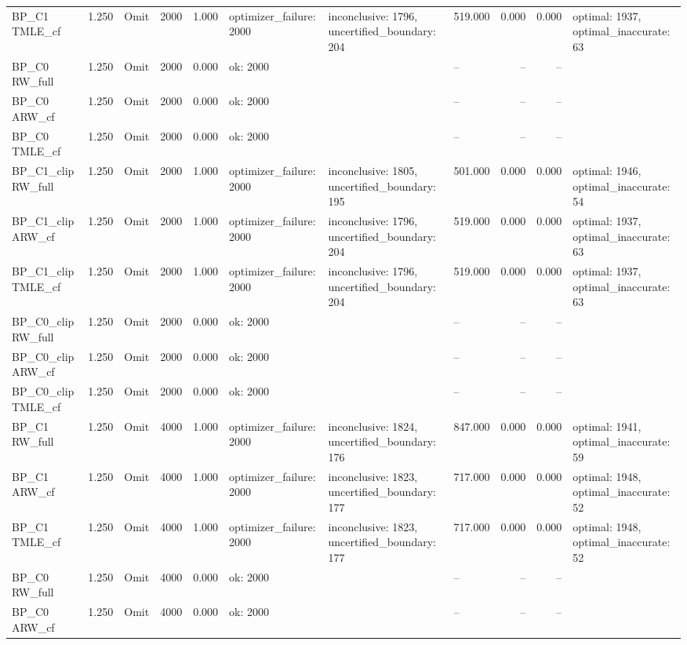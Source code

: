 \begin{tabular}{llllrlllrrl}
BP\_C1 TMLE\_cf & 1.250 & Omit & 2000 & 1.000 & optimizer\_failure: 2000 & inconclusive: 1796, uncertified\_boundary: 204 & 519.000 & 0.000 & 0.000 & optimal: 1937, optimal\_inaccurate: 63 \\
BP\_C0 RW\_full & 1.250 & Omit & 2000 & 0.000 & ok: 2000 &  & -- & -- & -- &  \\
BP\_C0 ARW\_cf & 1.250 & Omit & 2000 & 0.000 & ok: 2000 &  & -- & -- & -- &  \\
BP\_C0 TMLE\_cf & 1.250 & Omit & 2000 & 0.000 & ok: 2000 &  & -- & -- & -- &  \\
BP\_C1\_clip RW\_full & 1.250 & Omit & 2000 & 1.000 & optimizer\_failure: 2000 & inconclusive: 1805, uncertified\_boundary: 195 & 501.000 & 0.000 & 0.000 & optimal: 1946, optimal\_inaccurate: 54 \\
BP\_C1\_clip ARW\_cf & 1.250 & Omit & 2000 & 1.000 & optimizer\_failure: 2000 & inconclusive: 1796, uncertified\_boundary: 204 & 519.000 & 0.000 & 0.000 & optimal: 1937, optimal\_inaccurate: 63 \\
BP\_C1\_clip TMLE\_cf & 1.250 & Omit & 2000 & 1.000 & optimizer\_failure: 2000 & inconclusive: 1796, uncertified\_boundary: 204 & 519.000 & 0.000 & 0.000 & optimal: 1937, optimal\_inaccurate: 63 \\
BP\_C0\_clip RW\_full & 1.250 & Omit & 2000 & 0.000 & ok: 2000 &  & -- & -- & -- &  \\
BP\_C0\_clip ARW\_cf & 1.250 & Omit & 2000 & 0.000 & ok: 2000 &  & -- & -- & -- &  \\
BP\_C0\_clip TMLE\_cf & 1.250 & Omit & 2000 & 0.000 & ok: 2000 &  & -- & -- & -- &  \\
BP\_C1 RW\_full & 1.250 & Omit & 4000 & 1.000 & optimizer\_failure: 2000 & inconclusive: 1824, uncertified\_boundary: 176 & 847.000 & 0.000 & 0.000 & optimal: 1941, optimal\_inaccurate: 59 \\
BP\_C1 ARW\_cf & 1.250 & Omit & 4000 & 1.000 & optimizer\_failure: 2000 & inconclusive: 1823, uncertified\_boundary: 177 & 717.000 & 0.000 & 0.000 & optimal: 1948, optimal\_inaccurate: 52 \\
BP\_C1 TMLE\_cf & 1.250 & Omit & 4000 & 1.000 & optimizer\_failure: 2000 & inconclusive: 1823, uncertified\_boundary: 177 & 717.000 & 0.000 & 0.000 & optimal: 1948, optimal\_inaccurate: 52 \\
BP\_C0 RW\_full & 1.250 & Omit & 4000 & 0.000 & ok: 2000 &  & -- & -- & -- &  \\
BP\_C0 ARW\_cf & 1.250 & Omit & 4000 & 0.000 & ok: 2000 &  & -- & -- & -- &  \\

\end{tabular}
